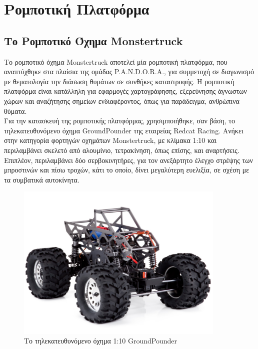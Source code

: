 
\chapter{Ρομποτική Πλατφόρμα} %


\label{Chapter2} %


\section{Το Ρομποτικό Όχημα Monstertruck}
Το ρομποτικό όχημα Monstertruck αποτελεί μία ρομποτική πλατφόρμα, που αναπτύχθηκε στα πλαίσια της ομάδας P.A.N.D.O.R.A., για συμμετοχή σε διαγωνισμό με θεματολογία την διάσωση θυμάτων σε συνθήκες καταστροφής. Η ρομποτική πλατφόρμα είναι κατάλληλη για εφαρμογές χαρτογράφησης, εξερεύνησης άγνωστων χώρων και αναζήτησης σημείων ενδιαφέροντος, όπως για παράδειγμα, ανθρώπινα θύματα.\\

Για την κατασκευή της ρομποτικής πλατφόρμας, χρησιμποιήθηκε, σαν βάση, το τηλεκατευθυνόμενο όχημα GroundPounder της εταιρείας Redcat Racing. Ανήκει στην κατηγορία φορτηγών οχημάτων Monstertruck, με κλίμακα 1:10 και περιλαμβάνει σκελετό από αλουμίνιο, τετρακίνηση, όπως επίσης, και αναρτήσεις. Επιπλέον, περιλαμβάνει δύο σερβοκινητήρες, για τον ανεξάρτητο έλεγχο στρέψης των μπροστινών και πίσω τροχών, κάτι το οποίο, δίνει μεγαλύτερη ευελιξία, σε σχέση με τα συμβατικά αυτοκίνητα.

\begin{figure}[!h]
	\begin{center}
		\includegraphics[width=10cm]{Chapters/Chapter2/Figures/groundpounder_chassis.jpg}
		\caption{Το τηλεκατευθυνόμενο όχημα 1:10 GroundPounder}
		\label{fig:groundpounder_chassis}
	\end{center}
\end{figure}


 